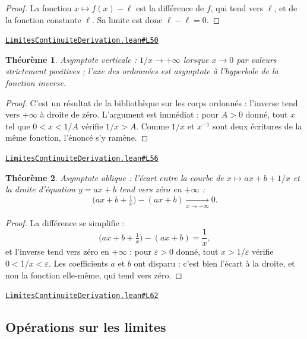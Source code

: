 \documentclass[11pt,a4paper]{article}
\theoremstyle{definition}
\theoremstyle{plain}
\newtheorem{theoreme}{Théorème}
\newcommand{\source}[2]{\par\smallskip\noindent\hfill{\footnotesize\href{#1}{\texttt{#2}}}\par\smallskip}
\begin{document}
\begin{proof}
La fonction $x \mapsto f(x) - \ell$ est la différence de $f$, qui tend vers $\ell$, et de
la fonction constante $\ell$. Sa limite est donc $\ell - \ell = 0$.
\end{proof}
\source{https://github.com/Commutator-IO/learn-lean/blob/main/cours/02-lycee/04-limites-continuite-derivation/LimitesContinuiteDerivation.lean\#L50}{LimitesContinuiteDerivation.lean\#L50}

\begin{theoreme}
Asymptote verticale : $1/x \to +\infty$ lorsque $x \to 0$ par valeurs strictement
positives ; l'axe des ordonnées est asymptote à l'hyperbole de la fonction inverse.
\end{theoreme}

\begin{proof}
C'est un résultat de la bibliothèque sur les corps ordonnés : l'inverse tend vers
$+\infty$ à droite de zéro. L'argument est immédiat : pour $A > 0$ donné, tout $x$ tel que
$0 < x < 1/A$ vérifie $1/x > A$. Comme $1/x$ et $x^{-1}$ sont deux écritures de la même
fonction, l'énoncé s'y ramène.
\end{proof}
\source{https://github.com/Commutator-IO/learn-lean/blob/main/cours/02-lycee/04-limites-continuite-derivation/LimitesContinuiteDerivation.lean\#L56}{LimitesContinuiteDerivation.lean\#L56}

\begin{theoreme}
Asymptote oblique : l'écart entre la courbe de $x \mapsto ax + b + 1/x$ et la droite
d'équation $y = ax + b$ tend vers zéro en $+\infty$ :
\[ \bigl(ax + b + \tfrac{1}{x}\bigr) - (ax + b) \xrightarrow[x \to +\infty]{} 0 . \]
\end{theoreme}

\begin{proof}
La différence se simplifie :
\[ \bigl(ax + b + \tfrac{1}{x}\bigr) - (ax + b) = \frac{1}{x} , \]
et l'inverse tend vers zéro en $+\infty$ : pour $\varepsilon > 0$ donné, tout $x > 1/\varepsilon$
vérifie $0 < 1/x < \varepsilon$. Les coefficients $a$ et $b$ ont disparu : c'est bien
l'écart à la droite, et non la fonction elle-même, qui tend vers zéro.
\end{proof}
\source{https://github.com/Commutator-IO/learn-lean/blob/main/cours/02-lycee/04-limites-continuite-derivation/LimitesContinuiteDerivation.lean\#L62}{LimitesContinuiteDerivation.lean\#L62}

\subsection{Opérations sur les limites}
\end{document}
